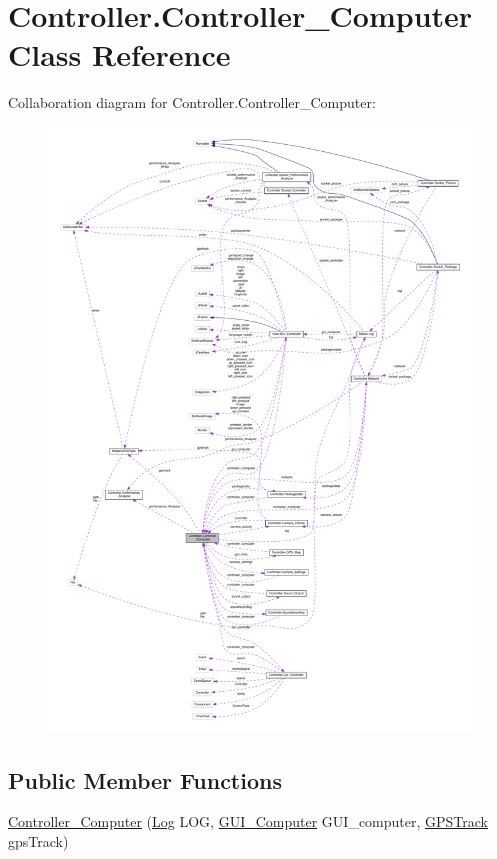 \hypertarget{class_controller_1_1_controller___computer}{}\section{Controller.\+Controller\+\_\+\+Computer Class Reference}
\label{class_controller_1_1_controller___computer}


Collaboration diagram for Controller.\+Controller\+\_\+\+Computer\+:
\nopagebreak
\begin{figure}[H]
\begin{center}
\leavevmode
\includegraphics[width=350pt]{class_controller_1_1_controller___computer__coll__graph}
\end{center}
\end{figure}
\subsection*{Public Member Functions}
\begin{DoxyCompactItemize}
\item 
\hyperlink{class_controller_1_1_controller___computer_a2dde7826a088d255ee6394857463ab7a}{Controller\+\_\+\+Computer} (\hyperlink{class_model_1_1_log}{Log} L\+O\+G, \hyperlink{class_view_1_1_g_u_i___computer}{G\+U\+I\+\_\+\+Computer} G\+U\+I\+\_\+computer, \hyperlink{class_model_1_1_g_p_s_track}{G\+P\+S\+Track} gps\+Track)
\end{DoxyCompactItemize}
